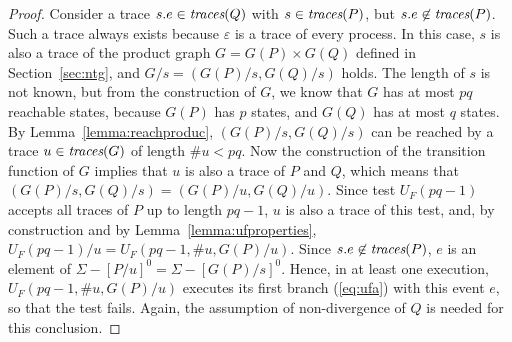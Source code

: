 \begin{proof}
\medskip
{} 
Consider a  trace $s.e\in\text{\it traces}(Q)$ with $s\in\text{\it traces}(P)$,
but $s.e\not\in\text{\it traces}(P)$. Such a trace always exists because $\varepsilon$ is
a trace of every process. In this case, $s$ is also a trace of the product
graph $G = G(P)\times G(Q)$ defined in Section~\ref{sec:ntg}, and $G/s =
(G(P)/s,G(Q)/s)$ holds. The length of $s$ is not known, but from the
construction of $G$,  we know that $G$ has at most $pq$ reachable states,
because $G(P)$ has $p$ states, and $G(Q)$ has at most $q$ states. By
Lemma~\ref{lemma:reachproduc}, $(G(P)/s,G(Q)/s)$ can be reached by a trace
$u\in\text{\it traces}(G)$ of length $\#u < pq$. Now the construction of the transition
function of $G$ implies that $u$ is also a trace of $P$ and $Q$, which means
that $(G(P)/s,G(Q)/s) = (G(P)/u,G(Q)/u)$. Since test $U_F(pq-1)$ accepts all
traces of $P$ up to length $pq-1$, $u$ is also a trace of this test, and, by
construction and by Lemma~\ref{lemma:ufproperties}, $U_F(pq-1)/u =
U_F(pq-1,\#u,G(P)/u)$. Since $s.e\not\in\text{\it traces}(P)$, $e$ is an element of
$\Sigma-[P/u]^0 = \Sigma - [G(P)/s]^0$. Hence, in at least one execution,
$U_F(pq-1,\#u,G(P)/u)$ executes its first branch (\ref{eq:ufa}) with this
event $e$, so that the test fails. Again, the assumption of non-divergence of
$Q$ is needed for this conclusion. 


\end{proof}
